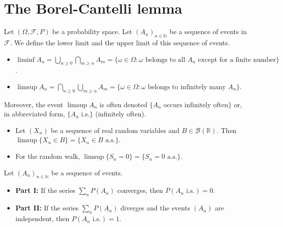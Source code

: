 \section{The Borel-Cantelli lemma}%
Let $(\Omega, \mathcal{F}, P)$ be a probability space. Let $(A_n)_{n \in \mathbb{N}}$ be a sequence of events in $\mathcal{F}$.
We define the lower limit and the upper limit of this sequence of events.%
\begin{definition}
\begin{itemize}
    \item $\liminf A_n = \bigcup_{n \ge 0} \bigcap_{m \ge n} A_m = \{ \omega \in \Omega : \omega \text{ belongs to all } A_n \text{ except for a finite number} \}$.
    \item $\limsup A_n = \bigcap_{n \ge 0} \bigcup_{m \ge n} A_m = \{ \omega \in \Omega : \omega \text{ belongs to infinitely many } A_n \}$.
\end{itemize}
Moreover, the event $\limsup A_n$ is often denoted $\{A_n \text{ occurs infinitely often}\}$ or, in abbreviated form, $\{A_n \text{ i.s.}\}$ (infinitely often).
\end{definition}%
\begin{example}
\begin{itemize}
    \item Let $(X_n)$ be a sequence of real random variables and $B \in \mathcal{B}(\mathbb{R})$. Then $\limsup \{X_n \in B\} = \{X_n \in B \text{ a.s.}\}$.
    \item For the random walk, $\limsup \{S_n=0\} = \{S_n=0 \text{ a.s.}\}$.
\end{itemize}
\end{example}%
\begin{lemma}
Let $(A_n)_{n \in \mathbb{N}}$ be a sequence of events.
\begin{itemize}
    \item \textbf{Part I:} If the series $\sum_n P(A_n)$ converges, then $P(A_n \text{ i.s.}) = 0$.
    \item \textbf{Part II:} If the series $\sum_n P(A_n)$ diverges and the events $(A_n)$ are independent, then $P(A_n \text{ i.s.}) = 1$.
\end{itemize}
\end{lemma}%
